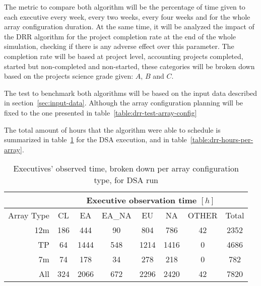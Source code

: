 The metric to compare both algorithm will be the percentage of time given to each executive every week, every two weeks, every four weeks and for the whole array configuration duration. At the same time, it will be analyzed the impact of the DRR algorithm for the project completion rate at the end of the whole simulation, checking if there is any adverse effect over this parameter. The completion rate will be based at project level, accounting projects completed, started but non-completed and non-started, these categories will be broken down based on the projects science grade given: $A$, $B$ and $C$.

The test to benchmark both algorithms will be based on the input data described in section~\ref{sec:input-data}. Although the array configuration planning will be fixed to the one presented in table~\ref{table:drr-test-array-config}

The total amount of hours that the algorithm were able to schedule is summarized in table~\ref{table:dsa-hours-per-array} for the DSA execution, and in table~\ref{table:drr-hours-per-array}.

\begin{table}[t]
\centering
\begin{tabular}{c|c|c|c|c|c|c|c|} 
\cline{2-8}
 & \multicolumn{7}{c|}{Executive observation time $[h]$} \\ \hline
\multicolumn{1}{|r|}{Array Type} & CL	& EA & EA\_NA &	EU & NA & OTHER & Total \\ \hline
\multicolumn{1}{|r|}{12m} & 186 & 444 & 90 & 804 & 786 & 42 & 2352 \\ \hline
\multicolumn{1}{|r|}{TP} & 64 & 1444 & 548 & 1214 & 1416 & 0 & 4686 \\ \hline
\multicolumn{1}{|r|}{7m} & 74 & 178 & 34 & 278 & 218 & 0 & 782 \\ \hline
\multicolumn{1}{|r|}{All} & 324 & 2066 & 672 & 2296 & 2420 & 42 & 7820 \\ \hline
\end{tabular}
\caption{Executives' observed time, broken down per array configuration type, for DSA run}
\label{table:dsa-hours-per-array}
\end{table}

